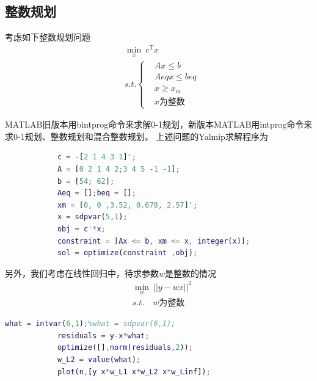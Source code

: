         \subsection{整数规划}
            \par
            考虑如下整数规划问题
            \begin{align*}
            & \min_x \ c^\mathrm{T}x\\
            & s.t.\left\{
            \begin{aligned}
            & Ax \leqslant b\\
            & Aeq x \leqslant beq\\
            & x \geqslant x_m\\
            & x\text{为整数}
            \end{aligned}
            \right.
            \end{align*}
            \par
            MATLAB旧版本用bintprog命令来求解0-1规划，新版本MATLAB用intprog命令来求0-1规划、整数规划和混合整数规划。
            上述问题的Yalmip求解程序为
            \begin{lstlisting}[language = Matlab]
            %% 整数规划
            c = -[2 1 4 3 1]';
            A = [0 2 1 4 2;3 4 5 -1 -1];
            b = [54; 62];
            Aeq = [];beq = [];
            xm = [0, 0 ,3.52, 0.678, 2.57]';
            x = sdpvar(5,1);
            obj = c'*x;
            constraint = [Ax <= b, xm <= x, integer(x)];
            sol = optimize(constraint ,obj);
            \end{lstlisting}
            \par
            另外，我们考虑在线性回归中，待求参数$w$是整数的情况
            \begin{align*}
            &\min_w \ ||y - wx||^2\\
            &s.t.\quad w\text{为整数}
            \end{align*}
            \begin{lstlisting}[language = Matlab]
            what = intvar(6,1);%what = sdpvar(6,1);
            residuals = y-x*what;
            optimize([],norm(residuals,2));
            w_L2 = value(what);
            plot(n,[y x*w_L1 x*w_L2 x*w_Linf]);
            \end{lstlisting}
